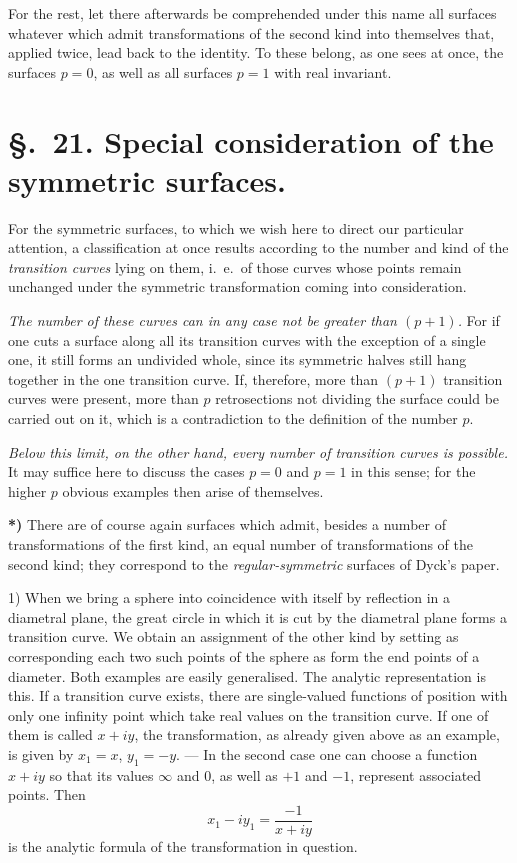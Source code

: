 \documentclass{article}
\begin{document}
For the rest, let there afterwards be comprehended under this name all surfaces whatever which admit transformations of the second kind into themselves that, applied twice, lead back to the identity. To these belong, as one sees at once, the surfaces $p = 0$, as well as all surfaces $p = 1$ with real invariant.

\section*{§.~21. Special consideration of the symmetric surfaces.}

For the symmetric surfaces, to which we wish here to direct our particular attention, a classification at once results according to the number and kind of the \emph{transition curves} lying on them, i.\ e.\ of those curves whose points remain unchanged under the symmetric transformation coming into consideration.

\emph{The number of these curves can in any case not be greater than $(p + 1)$.} For if one cuts a surface along all its transition curves with the exception of a single one, it still forms an undivided whole, since its symmetric halves still hang together in the one transition curve. If, therefore, more than $(p + 1)$ transition curves were present, more than $p$ retrosections not dividing the surface could be carried out on it, which is a contradiction to the definition of the number $p$.

\emph{Below this limit, on the other hand, every number of transition curves is possible.} It may suffice here to discuss the cases $p = 0$ and $p = 1$ in this sense; for the higher $p$ obvious examples then arise of themselves.

\textbf{*)} There are of course again surfaces which admit, besides a number of transformations of the first kind, an equal number of transformations of the second kind; they correspond to the \emph{regular-symmetric} surfaces of Dyck's paper.


1) When we bring a sphere into coincidence with itself by reflection in a diametral plane, the great circle in which it is cut by the diametral plane forms a transition curve. We obtain an assignment of the other kind by setting as corresponding each two such points of the sphere as form the end points of a diameter. Both examples are easily generalised. The analytic representation is this. If a transition curve exists, there are single-valued functions of position with only one infinity point which take real values on the transition curve. If one of them is called $x + iy$, the transformation, as already given above as an example, is given by $x_{1} = x$, $y_{1} = - y$. --- In the second case one can choose a function $x + iy$ so that its values $\infty$ and $0$, as well as $+ 1$ and $- 1$, represent associated points. Then
\[ x_{1} - iy_{1} = \frac{- 1}{x + iy} \]
is the analytic formula of the transformation in question.
\end{document}
